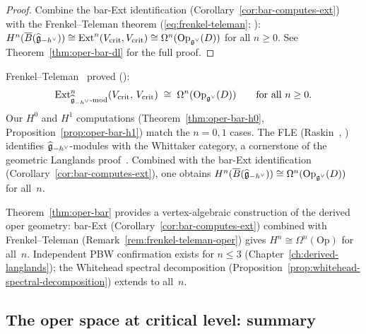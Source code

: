 \begin{proof}
Combine the bar-Ext identification
(Corollary~\ref{cor:bar-computes-ext}) with the
Frenkel--Teleman theorem
(\eqref{eq:frenkel-teleman}; \cite{FT06}):
$H^n(\overline{B}(\widehat{\mathfrak{g}}_{-h^\vee}))
\cong \mathrm{Ext}^n(V_{\mathrm{crit}}, V_{\mathrm{crit}})
\cong \Omega^n(\mathrm{Op}_{\mathfrak{g}^\vee}(D))$
for all $n \geq 0$.  See
Theorem~\ref{thm:oper-bar-dl} for the full proof.
\end{proof}

\begin{remark}%
\label{rem:frenkel-teleman-oper}
Frenkel--Teleman~\cite{FT06} proved (\ClaimStatusProvedElsewhere):
\begin{equation}\label{eq:frenkel-teleman}
\mathrm{Ext}^n_{\widehat{\mathfrak{g}}_{-h^\vee}\text{-mod}}
(V_{\mathrm{crit}},\, V_{\mathrm{crit}})
\;\cong\; \Omega^n(\mathrm{Op}_{\mathfrak{g}^\vee}(D))
\qquad \text{for all } n \geq 0.
\end{equation}
Our $H^0$ and $H^1$ computations (Theorem~\ref{thm:oper-bar-h0}, Proposition~\ref{prop:oper-bar-h1}) match the $n = 0,1$ cases.  The FLE (Raskin~\cite{Raskin24}, \ClaimStatusProvedElsewhere)
identifies $\widehat{\mathfrak{g}}_{-h^\vee}$-modules with the Whittaker category, a cornerstone of the geometric Langlands proof~\cite{GLC24}.  Combined with the bar-Ext identification (Corollary~\ref{cor:bar-computes-ext}), one obtains $H^n(\overline{B}(\widehat{\mathfrak{g}}_{-h^\vee})) \cong \Omega^n(\mathrm{Op}_{\mathfrak{g}^\vee}(D))$ for all~$n$.
\end{remark}

\begin{remark}[Scope]\label{rem:oper-bar-scope}
Theorem~\ref{thm:oper-bar} provides a vertex-algebraic construction of the derived oper geometry: bar-Ext (Corollary~\ref{cor:bar-computes-ext}) combined with Frenkel--Teleman (Remark~\ref{rem:frenkel-teleman-oper}) gives $H^n \cong \Omega^n(\mathrm{Op})$ for all~$n$.  Independent PBW confirmation exists for $n \leq 3$ (Chapter~\ref{ch:derived-langlands}); the Whitehead spectral decomposition (Proposition~\ref{prop:whitehead-spectral-decomposition}) extends to all~$n$.
\end{remark}

\subsection{The oper space at critical level: summary}
\label{subsec:oper-critical-summary}

